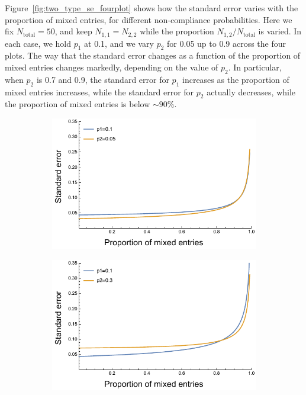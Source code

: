 \documentclass[aoas]{imsart}
\begin{document}
Figure~\ref{fig:two_type_se_fourplot} shows how the standard error varies with the proportion of mixed entries, for different non-compliance probabilities.  {Here we fix $N_\text{total}=50$, and keep $N_{1,1}=N_{2,2}$ while the proportion $N_{1,2}/N_\text{total}$ is varied.} In each case, we hold \(p_1\) at 0.1, and we vary \(p_2\) for 0.05 up to 0.9 across the four plots. The way that the standard error changes as a function of the proportion of mixed entries changes markedly, depending on the value of \(p_2\). In particular, when \(p_2\) is 0.7 and 0.9, the standard error for \(p_1\) increases as the proportion of mixed entries increases, while the standard error for \(p_2\) actually decreases, while the proportion of mixed entries is below \(\sim 90 \%\).



\begin{figure}[h]
\begin{subfigure}[b]{.49\textwidth}
\includegraphics[width=\textwidth]{../asymptotic_approximation/SE_twotype_p1_01_p2_005.pdf}
\end{subfigure}
\hfill
\begin{subfigure}[b]{0.49\textwidth}
\includegraphics[width=\textwidth]{../asymptotic_approximation/SE_twotype_p1_01_p2_03.pdf}

\end{subfigure}
\end{figure}
\end{document}
